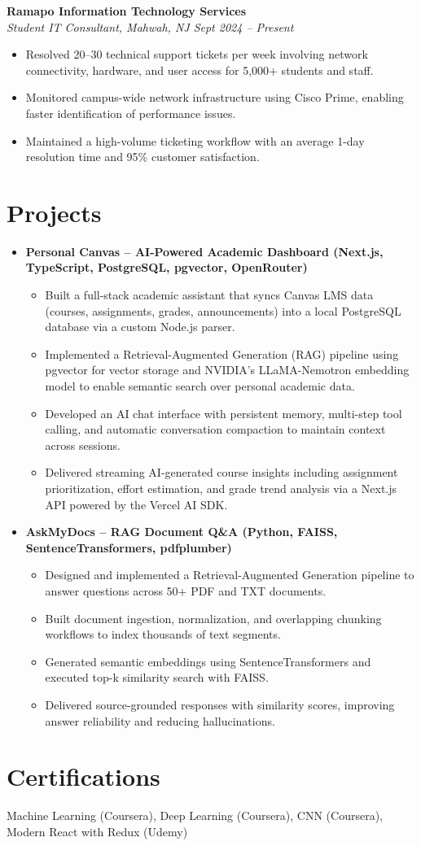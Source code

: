 \documentclass[4paper,25pt]{article}
\newcommand{\resumeSubHeadingListStart}{\begin{itemize}[leftmargin=*]}
\newcommand{\resumeSubHeadingListEnd}{\end{itemize}}
\begin{document}
\textbf{Ramapo Information Technology Services} \\
\textit{Student IT Consultant, Mahwah, NJ \hfill Sept 2024 -- Present}
\begin{itemize}
    \item Resolved 20--30 technical support tickets per week involving network connectivity, hardware, and user access for 5,000+ students and staff.
    \item Monitored campus-wide network infrastructure using Cisco Prime, enabling faster identification of performance issues.
    \item Maintained a high-volume ticketing workflow with an average 1-day resolution time and 95\% customer satisfaction.
\end{itemize}

\section{Projects}
\resumeSubHeadingListStart

\item \textbf{Personal Canvas – AI-Powered Academic Dashboard (Next.js, TypeScript, PostgreSQL, pgvector, OpenRouter)}
\begin{itemize}
    \item Built a full-stack academic assistant that syncs Canvas LMS data (courses, assignments, grades, announcements) into a local PostgreSQL database via a custom Node.js parser.
    \item Implemented a Retrieval-Augmented Generation (RAG) pipeline using pgvector for vector storage and NVIDIA's LLaMA-Nemotron embedding model to enable semantic search over personal academic data.
    \item Developed an AI chat interface with persistent memory, multi-step tool calling, and automatic conversation compaction to maintain context across sessions.
    \item Delivered streaming AI-generated course insights including assignment prioritization, effort estimation, and grade trend analysis via a Next.js API powered by the Vercel AI SDK.
\end{itemize}

\item \textbf{AskMyDocs – RAG Document Q\&A (Python, FAISS, SentenceTransformers, pdfplumber)}
\begin{itemize}
    \item Designed and implemented a Retrieval-Augmented Generation pipeline to answer questions across 50+ PDF and TXT documents.
    \item Built document ingestion, normalization, and overlapping chunking workflows to index thousands of text segments.
    \item Generated semantic embeddings using SentenceTransformers and executed top-k similarity search with FAISS.
    \item Delivered source-grounded responses with similarity scores, improving answer reliability and reducing hallucinations.
\end{itemize}

\resumeSubHeadingListEnd

\section{Certifications}
Machine Learning (Coursera), Deep Learning (Coursera), CNN (Coursera), Modern React with Redux (Udemy)
\end{document}
